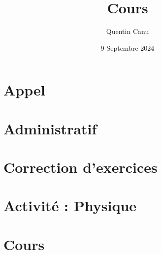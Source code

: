 \documentclass{article}
\title{Cours}
\date{9 Septembre 2024}
\author{Quentin Canu}
\begin{document}
\maketitle

\section{Appel}
\section{Administratif}
\section{Correction d'exercices}
\section{Activité : Physique}
\section{Cours}
\end{document}
